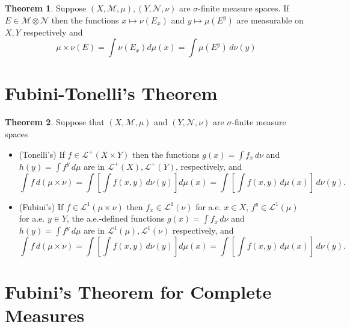 \documentclass{article}
\theoremstyle{definition}
\newcommand{\lag}{\mathcal{L}}
\newcommand{\lb}{\left[}
\newcommand{\rb}{\right]}
\theoremstyle{theorem}
\newtheorem{theorem}{Theorem}[section]
\begin{document}
\begin{theorem}
Suppose $(X,\mathcal{M},\mu), (Y,\mathcal{N},\nu)$ are $\sigma$-finite measure spaces. If $E\in \mathcal{M}\otimes \mathcal{N}$ then the functions $x\mapsto \nu(E_x)$ and $y\mapsto \mu(E^y)$ are measurable on $X,Y$ respectively and
\begin{equation*}
    \mu\times \nu(E) = \int \nu(E_x)d\mu(x) = \int \mu(E^y)\,d\nu(y)
\end{equation*}
\end{theorem}





\section{Fubini-Tonelli's Theorem}





\begin{theorem}
Suppose that $(X,\mathcal{M},\mu)$ and $(Y,\mathcal{N},\nu)$ are $\sigma$-finite measure spaces
\begin{itemize}
    \item (Tonelli's) If $f \in \lag^+(X\times Y)$ then the functions $g(x) =\int f_x\,d\nu$ and $h(y) = \int f^y \,d\mu$ are in $\lag^+(X), \lag^+(Y)$, respectively, and
    \begin{equation*}
        \int f \,d(\mu\times \nu) = \int \lb \int f(x,y)\,d\nu(y) \rb d\mu(x) = \int \lb \int f(x,y)\,d\mu(x) \rb \,d\nu(y).
    \end{equation*}
    
    \item (Fubini's) If $f \in \lag^1(\mu\times \nu)$ then $f_x \in \lag^1(\nu)$ for a.e. $x\in X$,  $f^y \in \lag^1(\mu)$ for a.e. $y\in Y$, the a.e.-defined functions $g(x) = \int f_x\,d\nu$ and $h(y) = \int f^y\,d\mu$ are in $\lag^1(\mu),\lag^1(\nu)$ respectively, and   
    \begin{equation*}
        \int f \,d(\mu\times \nu) = \int \lb \int f(x,y)\,d\nu(y) \rb d\mu(x) = \int \lb \int f(x,y)\,d\mu(x) \rb \,d\nu(y).
    \end{equation*}
\end{itemize}
\end{theorem}


\section{Fubini's Theorem for Complete Measures}
\end{document}
